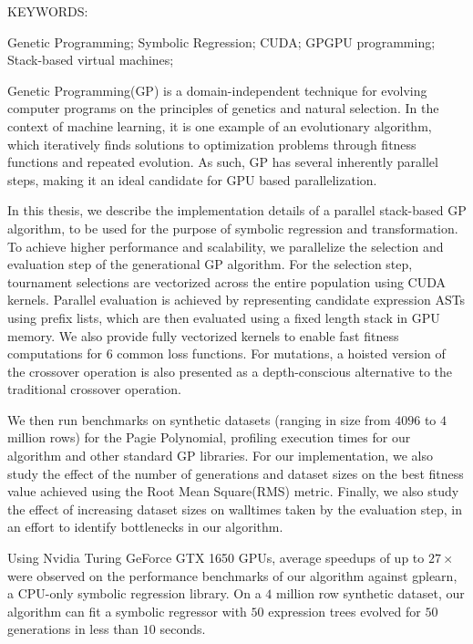 \abstract

\noindent KEYWORDS: \hspace*{0.5em} 
\parbox[t]{4.4in}{  
  Genetic Programming;
	Symbolic Regression; 
  CUDA;
  GPGPU programming; 
  Stack-based virtual machines; 
}

\vspace*{24pt}

\noindent Genetic Programming(GP) is a domain-independent technique for evolving computer programs on the principles of genetics and natural selection. In the context of machine learning, it is one example of an evolutionary algorithm, which iteratively finds solutions to optimization problems through fitness functions and repeated evolution. As such, GP has several inherently parallel steps, making it an ideal candidate for GPU based parallelization. 

In this thesis, we describe the implementation details of a parallel stack-based GP algorithm, to be used for the purpose of symbolic regression and transformation. To achieve higher performance and scalability, we parallelize the selection and evaluation step of the generational GP algorithm. 
For the selection step, tournament selections are vectorized across the entire population using CUDA kernels. 
Parallel evaluation is achieved by representing candidate expression ASTs using prefix lists, which are then evaluated using a fixed length stack in GPU memory.
We also provide fully vectorized kernels to enable fast fitness computations for $6$ common loss functions. For mutations, a hoisted version of the crossover operation is also presented as a depth-conscious alternative to the traditional crossover operation.

We then run benchmarks on synthetic datasets (ranging in size from $4096$ to $4$ million rows) for the Pagie Polynomial, profiling execution times for our algorithm and other standard GP libraries. For our implementation, we also study the effect of the number of generations and dataset sizes on the best fitness value achieved using the Root Mean Square(RMS) metric. Finally, we also study the effect of increasing dataset sizes on walltimes taken by the evaluation step, in an effort to identify bottlenecks in our algorithm.

Using Nvidia Turing GeForce GTX 1650 GPUs, average speedups of up to $27\times$ were observed on the performance benchmarks of our algorithm against gplearn, a CPU-only symbolic regression library. On a $4$ million row synthetic dataset, our algorithm can fit a symbolic regressor with $50$ expression trees evolved for $50$ generations in less than $10$ seconds. 

